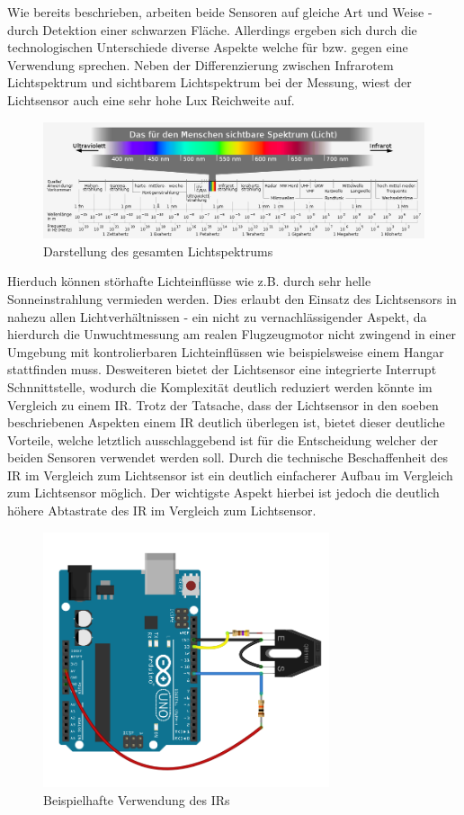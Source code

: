 Wie bereits beschrieben, arbeiten beide Sensoren auf gleiche Art und Weise - durch Detektion einer schwarzen Fläche. 
Allerdings ergeben sich durch die technologischen Unterschiede diverse Aspekte welche für bzw. gegen eine Verwendung sprechen.
Neben der Differenzierung zwischen Infrarotem Lichtspektrum und sichtbarem Lichtspektrum bei der Messung, wiest der Lichtsensor auch eine sehr hohe Lux Reichweite auf.
\begin{figure}[H]
	\centering
	\includegraphics[width=\textwidth]{images/chapter/03/lichtspektrum.png}
	\caption{Darstellung des gesamten Lichtspektrums \cite[]{light_spectrum}}
\end{figure}
Hierduch können störhafte Lichteinflüsse wie z.B. durch sehr helle Sonneinstrahlung vermieden werden.
Dies erlaubt den Einsatz des Lichtsensors in nahezu allen Lichtverhältnissen - ein nicht zu vernachlässigender Aspekt, da hierdurch die Unwuchtmessung am realen Flugzeugmotor nicht zwingend in einer Umgebung mit kontrolierbaren Lichteinflüssen wie beispielsweise einem Hangar stattfinden muss.
Desweiteren bietet der Lichtsensor eine integrierte Interrupt Schnnittstelle, wodurch die Komplexität deutlich reduziert werden könnte im Vergleich zu einem \ac{IR}.
Trotz der Tatsache, dass der Lichtsensor in den soeben beschriebenen Aspekten einem \ac{IR} deutlich überlegen ist, bietet dieser deutliche Vorteile, welche letztlich ausschlaggebend ist für die Entscheidung welcher der beiden Sensoren verwendet werden soll.
Durch die technische Beschaffenheit des \ac{IR} im Vergleich zum Lichtsensor ist ein deutlich einfacherer Aufbau im Vergleich zum Lichtsensor möglich.
Der wichtigste Aspekt hierbei ist jedoch die deutlich höhere Abtastrate des \ac{IR} im Vergleich zum Lichtsensor. 
\begin{figure}[H]
	\centering
	\includegraphics[width=0.75\textwidth]{images/chapter/03/sensor_ir_schaltung.png}
	\caption{Beispielhafte Verwendung des \ac{IR}s \cite{sensor_ir_schaltung}}
	\label{fig:ir_example}
\end{figure}
